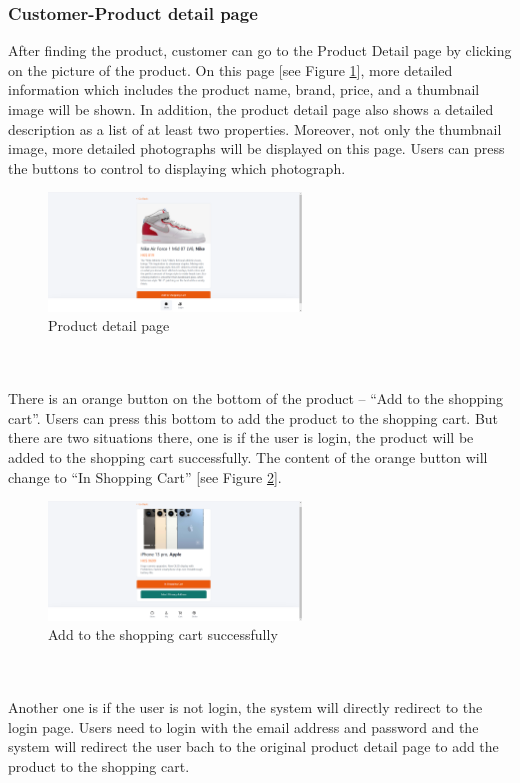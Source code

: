 \documentclass{article}
\begin{document}
\subsubsection{Customer-Product detail page}
After finding the product, customer can go to the Product Detail page by clicking on the picture of the product. On this page [see Figure \ref{fig:product detail page}], more detailed information which includes the product name, brand, price, and a thumbnail image will be shown. In addition, the product detail page also shows a detailed description as a list of at least two properties. Moreover, not only the thumbnail image, more detailed photographs will be displayed on this page. Users can press the buttons to control to displaying which photograph.
\begin{figure}[!htp]
    \centering
    \includegraphics[width=0.6\textwidth]{product detail page.png}
    \caption{\label{fig:product detail page}Product detail page }
\end{figure}
\\\\
There is an orange button on the bottom of the product -- “Add to the shopping cart”. Users can press this bottom to add the product to the shopping cart. But there are two situations there, one is if the user is login, the product will be added to the shopping cart successfully. The content of the orange button will change to “In Shopping Cart” [see Figure \ref{fig:add in shopping_cart}].
\begin{figure}[!htp]
    \centering
    \includegraphics[width=0.6\textwidth]{Add in shopping_cart.png}
    \caption{\label{fig:add in shopping_cart} Add to the shopping cart successfully}
\end{figure}
\\\\
Another one is if the user is not login, the system will directly redirect to the login page. Users need to login with the email address and password and the system will redirect the user bach to the original product detail page to add the product to the shopping cart.
\end{document}
